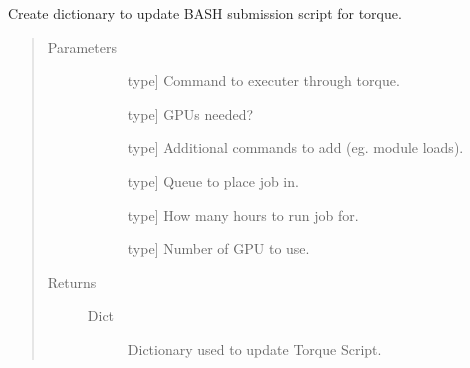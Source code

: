 \documentclass[letterpaper,10pt,english]{sphinxmanual}
\begin{document}
\begin{fulllineitems}
\label{\detokenize{index:methylnet.torque_jobs.assemble_replace_dict}}
Create dictionary to update BASH submission script for torque.
\begin{quote}\begin{description}
\item[{Parameters}] \leavevmode\begin{description}
\item[{}] \leavevmode{[}type{]}
Command to executer through torque.

\item[{}] \leavevmode{[}type{]}
GPUs needed?

\item[{}] \leavevmode{[}type{]}
Additional commands to add (eg. module loads).

\item[{}] \leavevmode{[}type{]}
Queue to place job in.

\item[{}] \leavevmode{[}type{]}
How many hours to run job for.

\item[{}] \leavevmode{[}type{]}
Number of GPU to use.

\end{description}

\item[{Returns}] \leavevmode\begin{description}
\item[{Dict}] \leavevmode
Dictionary used to update Torque Script.

\end{description}

\end{description}\end{quote}

\end{fulllineitems}

\end{document}
